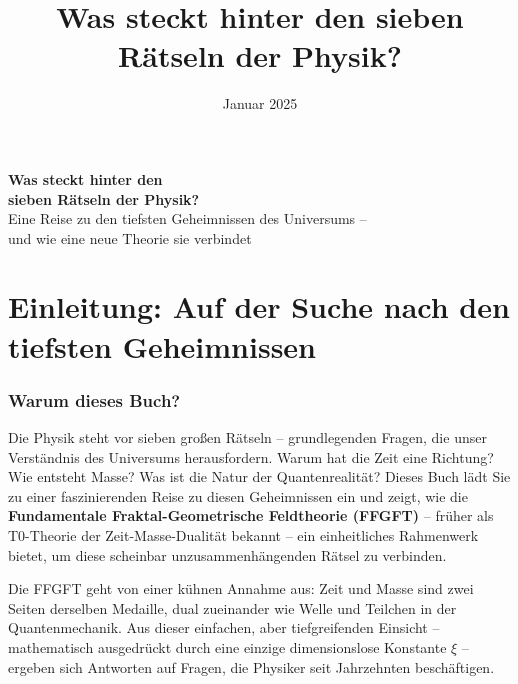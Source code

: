 \documentclass[11pt,oneside]{book}
\title{Was steckt hinter den sieben Rätseln der Physik?}
\author{}
\date{Januar 2025}
\begin{document}
	\let\cleardoublepage\clearpage
	
	\setcounter{section}{0}
	\setcounter{subsection}{0}
	\setcounter{subsubsection}{0}
	\setcounter{paragraph}{0}
	
	\setcounter{secnumdepth}{1}  %
	\setcounter{tocdepth}{1}     %
	\begin{center}
		\vspace*{2cm}
		{\Huge\textbf{Was steckt hinter den\\sieben Rätseln der Physik?}}\\[1.5cm]
		{\Large Eine Reise zu den tiefsten Geheimnissen des Universums –\\und wie eine neue Theorie sie verbindet}\\[2cm]
	\end{center}
	
	\frontmatter
	\pagestyle{empty}
	
	\mainmatter
	\pagestyle{plain}
	
	\tableofcontents
	
	

	\chapter*{Einleitung: Auf der Suche nach den tiefsten Geheimnissen}
	
	\subsection*{Warum dieses Buch?}
	
	Die Physik steht vor sieben großen Rätseln – grundlegenden Fragen, die unser Verständnis des Universums herausfordern. Warum hat die Zeit eine Richtung? Wie entsteht Masse? Was ist die Natur der Quantenrealität? Dieses Buch lädt Sie zu einer faszinierenden Reise zu diesen Geheimnissen ein und zeigt, wie die \textbf{Fundamentale Fraktal-Geometrische Feldtheorie (FFGFT)} – früher als T0-Theorie der Zeit-Masse-Dualität bekannt – ein einheitliches Rahmenwerk bietet, um diese scheinbar unzusammenhängenden Rätsel zu verbinden.
	
	Die FFGFT geht von einer kühnen Annahme aus: Zeit und Masse sind zwei Seiten derselben Medaille, dual zueinander wie Welle und Teilchen in der Quantenmechanik. Aus dieser einfachen, aber tiefgreifenden Einsicht – mathematisch ausgedrückt durch eine einzige dimensionslose Konstante \(\xi\) – ergeben sich Antworten auf Fragen, die Physiker seit Jahrzehnten beschäftigen.
	
\end{document}
